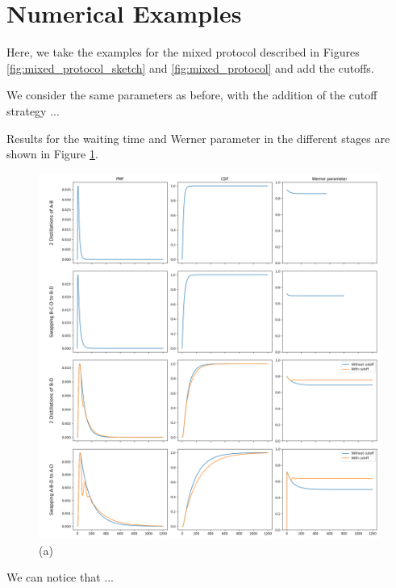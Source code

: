 \documentclass{masterthesis}
\begin{document}
\section*{Numerical Examples}

Here, we take the examples for the mixed protocol described in Figures \ref{fig:mixed_protocol_sketch} and \ref{fig:mixed_protocol} and add the cutoffs.

We consider the same parameters as before, with the addition of the cutoff strategy ...

Results for the waiting time and Werner parameter in the different stages are shown in Figure \ref{fig:mixed_protocol_cutoffs}.

\begin{figure}
    \centering
    \includegraphics[width=1\linewidth]{images/mixed_protocol_cutoffs.png}
    \caption{(a)} 
    \label{fig:mixed_protocol_cutoffs}
\end{figure}

We can notice that ...

\end{document}
